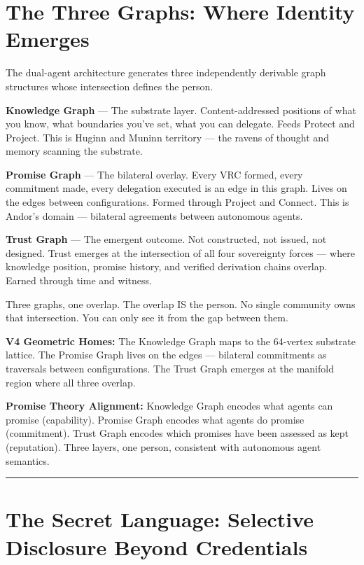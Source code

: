 \documentclass[
  11pt,
]{article}
\begin{document}
\section{The Three Graphs: Where Identity
Emerges}\label{the-three-graphs-where-identity-emerges}

The dual-agent architecture generates three independently derivable
graph structures whose intersection defines the person.

\textbf{Knowledge Graph} --- The substrate layer. Content-addressed
positions of what you know, what boundaries you've set, what you can
delegate. Feeds Protect and Project. This is Huginn and Muninn territory
--- the ravens of thought and memory scanning the substrate.

\textbf{Promise Graph} --- The bilateral overlay. Every VRC formed,
every commitment made, every delegation executed is an edge in this
graph. Lives on the edges between configurations. Formed through Project
and Connect. This is Andor's domain --- bilateral agreements between
autonomous agents.

\textbf{Trust Graph} --- The emergent outcome. Not constructed, not
issued, not designed. Trust emerges at the intersection of all four
sovereignty forces --- where knowledge position, promise history, and
verified derivation chains overlap. Earned through time and witness.

Three graphs, one overlap. The overlap IS the person. No single
community owns that intersection. You can only see it from the gap
between them.

\textbf{V4 Geometric Homes:} The Knowledge Graph maps to the 64-vertex
substrate lattice. The Promise Graph lives on the edges --- bilateral
commitments as traversals between configurations. The Trust Graph
emerges at the manifold region where all three overlap.

\textbf{Promise Theory Alignment:} Knowledge Graph encodes what agents
can promise (capability). Promise Graph encodes what agents do promise
(commitment). Trust Graph encodes which promises have been assessed as
kept (reputation). Three layers, one person, consistent with autonomous
agent semantics.

\begin{center}\rule{0.5\linewidth}{0.5pt}\end{center}

\section{The Secret Language: Selective Disclosure Beyond
Credentials}\label{the-secret-language-selective-disclosure-beyond-credentials}
\end{document}
